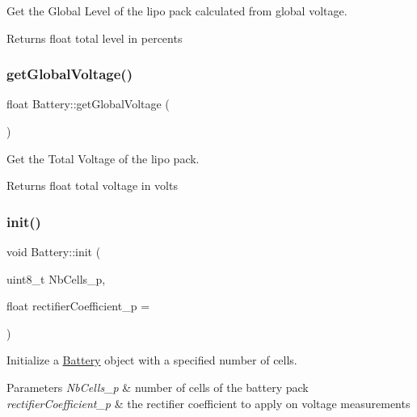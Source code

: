 Get the Global Level of the lipo pack calculated from global voltage. 

\begin{DoxyReturn}{Returns}
float total level in percents 
\end{DoxyReturn}
\mbox{\label{class_battery_a288d5d3b5ebbe964751a9d64519aacdb}} 
\subsubsection{\texorpdfstring{get\+Global\+Voltage()}{getGlobalVoltage()}}
{\footnotesize\ttfamily float Battery\+::get\+Global\+Voltage (\begin{DoxyParamCaption}{ }\end{DoxyParamCaption})}



Get the Total Voltage of the lipo pack. 

\begin{DoxyReturn}{Returns}
float total voltage in volts 
\end{DoxyReturn}
\mbox{\label{class_battery_aed541975df2c26475cbc0c37a9ddf659}} 
\subsubsection{\texorpdfstring{init()}{init()}}
{\footnotesize\ttfamily void Battery\+::init (\begin{DoxyParamCaption}\item[{uint8\+\_\+t}]{Nb\+Cells\+\_\+p,  }\item[{float}]{rectifier\+Coefficient\+\_\+p = {} }\end{DoxyParamCaption})}



Initialize a \hyperlink{class_battery}{Battery} object with a specified number of cells. 


\begin{DoxyParams}{Parameters}
{\em Nb\+Cells\+\_\+p} & number of cells of the battery pack \\
\hline
{\em rectifier\+Coefficient\+\_\+p} & the rectifier coefficient to apply on voltage measurements \\
\hline
\end{DoxyParams}
\mbox{\label{class_battery_a66ad0266d08fe7d72c90d54654dffcea}} 
